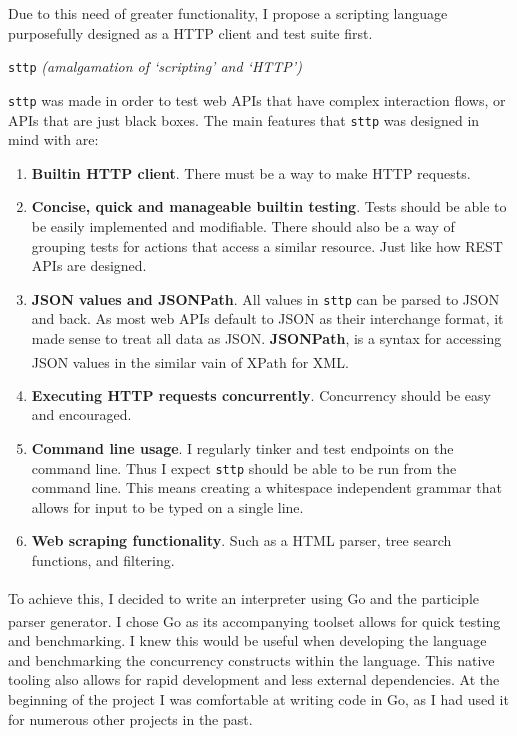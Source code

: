 \documentclass[]{full}
\theoremstyle{definition}
\begin{document}
Due to this need of greater functionality, I propose a scripting language purposefully designed as a HTTP client and test suite first.

\begin{center}
\verb|sttp| \textit{(amalgamation of `scripting' and `HTTP')}
\end{center}

\verb|sttp| was made in order to test web APIs that have complex interaction flows, or APIs that are just black boxes. The main features that \verb|sttp| was designed in mind with are:

\begin{enumerate}
    \item \textbf{Builtin HTTP client}. There must be a way to make HTTP requests.
    \item \textbf{Concise, quick and manageable builtin testing}. Tests should be able to be easily implemented and modifiable. There should also be a way of grouping tests for actions that access a similar resource. Just like how REST APIs are designed.
    \item \textbf{JSON values and JSONPath}. All values in \verb|sttp| can be parsed to JSON and back. As most web APIs default to JSON as their interchange format, it made sense to treat all data as JSON. \textbf{JSONPath}, is a syntax for accessing JSON values in the similar vain of XPath for XML\textsuperscript{\cite{goessner_2007}}.
    \item \textbf{Executing HTTP requests concurrently}. Concurrency should be easy and encouraged.
    \item \textbf{Command line usage}. I regularly tinker and test endpoints on the command line. Thus I expect \verb|sttp| should be able to be run from the command line. This means creating a whitespace independent grammar that allows for input to be typed on a single line.
    \item \textbf{Web scraping functionality}. Such as a HTML parser, tree search functions, and filtering.
\end{enumerate}

To achieve this, I decided to write an interpreter using Go\textsuperscript{\cite{the_go_programming_language}} and the participle parser generator\textsuperscript{\cite{thomas_2021}}. I chose Go as its accompanying toolset allows for quick testing and benchmarking. I knew this would be useful when developing the language and benchmarking the concurrency constructs within the language. This native tooling also allows for rapid development and less external dependencies. At the beginning of the project I was comfortable at writing code in Go, as I had used it for numerous other projects in the past.
\end{document}
